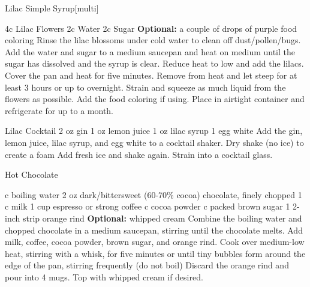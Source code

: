 \documentclass[../cookbook.tex]{subfiles}
\begin{document}
\begin{recipe}{Lilac Simple Syrup}[multi]

\ingredients
	{4c Lilac Flowers}
	{2c Water}
	{2c Sugar}
	{\textbf{Optional:} a couple of drops of purple food coloring}
\stopingredients
\preparation
	{Rinse the lilac blossoms under cold water to clean off dust/pollen/bugs.}
	{Add the water and sugar to a medium saucepan and heat on medium until the sugar has dissolved and the syrup is clear.}
	{Reduce heat to low and add the lilacs. Cover the pan and heat for five minutes.}
	{Remove from heat and let steep for at least 3 hours or up to overnight.}
	{Strain and squeeze as much liquid from the flowers as possible.}
	{Add the food coloring if using.}
	{Place in airtight container and refrigerate for up to a month.}
\stopprep
\end{recipe}
\vspace{1 in}
\begin{recipe}{Lilac Cocktail}
\ingredients
    {2 oz gin}
    {1 oz lemon juice}
    {1 oz lilac syrup}
    {1 egg white}
\stopingredients
\preparation
    {Add the gin, lemon juice, lilac syrup, and egg white to a cocktail shaker. Dry shake (no ice) to create a foam}
    {Add fresh ice and shake again.}
    {Strain into a cocktail glass.}
\stopprep
\end{recipe}
\begin{recipe}{Hot Chocolate}
\begin{center}
\end{center}
\ingredients
    { c boiling water}
    {2 oz dark/bittersweet (60-70\% cocoa) chocolate, finely chopped}
    {1  c milk}
    {1 cup espresso or strong coffee}
    { c cocoa powder}
    { c packed brown sugar}
    {1 2-inch strip orange rind}
    {\textbf{Optional:} whipped cream}
\stopingredients
\preparation
    {Combine the boiling water and chopped chocolate in a medium saucepan, stirring until the chocolate melts.}
    {Add milk, coffee, cocoa powder, brown sugar, and orange rind. Cook over medium-low heat, stirring with a whisk, for five minutes or until tiny bubbles form around the edge of the pan, stirring frequently (do not boil)}
    {Discard the orange rind and pour into 4 mugs.}
    {Top with whipped cream if desired.}
\stopprep
\end{recipe}
\end{document}
